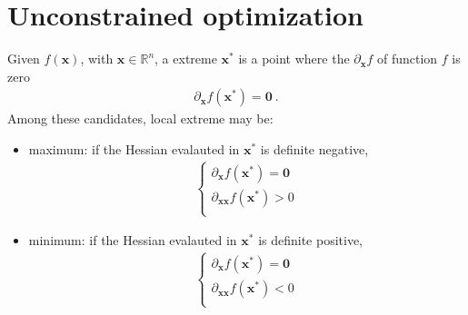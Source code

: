\documentclass[letterpaper,10pt,english]{jupyterBook}
\begin{document}
\section{Unconstrained optimization}
\label{\detokenize{ch/optimization/intro:unconstrained-optimization}}\label{\detokenize{ch/optimization/intro:optimization-constrained}}
\sphinxAtStartPar
Given \(f(\mathbf{x})\), with \(\mathbf{x} \in \mathbb{R}^n\), a  extreme \(\mathbf{x}^*\) is a point where the  \(\partial_\mathbf{x} f\) of function \(f\) is zero
\begin{equation*}
\begin{split}\partial_{\mathbf{x}} f(\mathbf{x}^*) = \mathbf{0} \ .\end{split}
\end{equation*}
\sphinxAtStartPar
Among these candidates, local extreme may be:
\begin{itemize}
\item {} 
\sphinxAtStartPar
maximum: if the Hessian evalauted in \(\mathbf{x}^*\) is definite negative,
\begin{equation*}
\begin{split}\begin{cases}
    \partial_{\mathbf{x}} f(\mathbf{x}^*) = \mathbf{0} \\
    \partial_{\mathbf{x} \mathbf{x}} f(\mathbf{x}^*) > 0 \\
  \end{cases}\end{split}
\end{equation*}
\item {} 
\sphinxAtStartPar
minimum: if the Hessian evalauted in \(\mathbf{x}^*\) is definite positive,
\begin{equation*}
\begin{split}\begin{cases}
    \partial_{\mathbf{x}} f(\mathbf{x}^*) = \mathbf{0} \\
    \partial_{\mathbf{x} \mathbf{x}} f(\mathbf{x}^*) < 0 \\
  \end{cases}\end{split}
\end{equation*}
\end{itemize}
\end{document}
